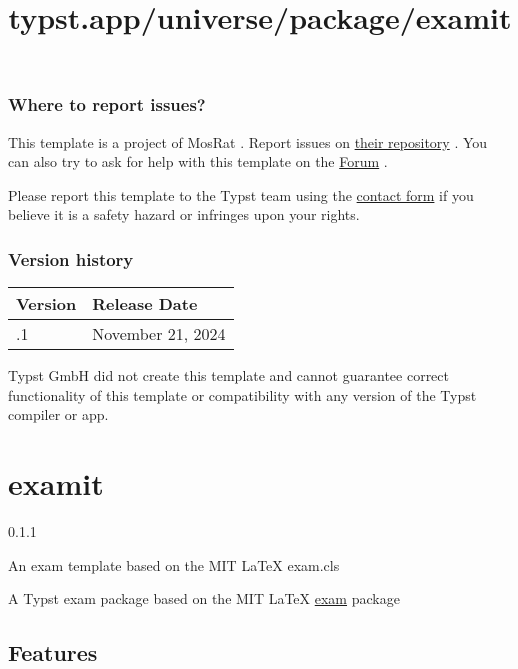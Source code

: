 \subsubsection{Where to report issues?}\label{where-to-report-issues}

This template is a project of MosRat . Report issues on
\href{https://github.com/mosrat/modern-bnu-thesis}{their repository} .
You can also try to ask for help with this template on the
\href{https://forum.typst.app}{Forum} .

Please report this template to the Typst team using the
\href{https://typst.app/contact}{contact form} if you believe it is a
safety hazard or infringes upon your rights.

\label{versions}
\subsubsection{Version history}\label{version-history}

\begin{longtable}[]{@{}ll@{}}
\toprule\noalign{}
Version & Release Date \\
\midrule\noalign{}
\endhead
\bottomrule\noalign{}
\endlastfoot
0.0.1 & November 21, 2024 \\
\end{longtable}

Typst GmbH did not create this template and cannot guarantee correct
functionality of this template or compatibility with any version of the
Typst compiler or app.


\title{typst.app/universe/package/examit}

\label{banner}
\section{examit}\label{examit}

{ 0.1.1 }

An exam template based on the MIT LaTeX exam.cls

\label{readme}
A Typst exam package based on the MIT LaTeX
\href{https://ctan.org/pkg/exam}{exam} package

\subsection{Features}\label{features}


